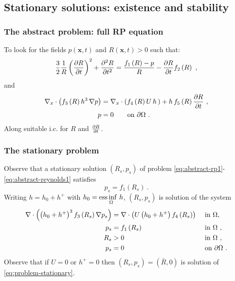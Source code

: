 \documentclass[10pt,aspectratio=169]{beamer}
\newenvironment{nalign}{
	\begin{equation}
	\begin{aligned}
}{
	\end{aligned}
	\end{equation}
	\ignorespacesafterend
}
\begin{document}

\subsection{Stationary solutions: existence and stability}
\setcounter{showSlideNumbers}{0}
\begin{frame}[noframenumbering]
\tableofcontents[
currentsection,
currentsubsection,
subsectionstyle=show/shaded/hide
]
\end{frame}
\setcounter{showSlideNumbers}{1}


\begin{frame}
\frametitle{The abstract problem: full RP equation}
To look for the fields $p(\mathbf{x},t)$ and $R(\mathbf{x},t)>0$ such that:
\begin{equation*}
\frac{3}{2}\frac{1}{R}\left(\frac{\partial R}{\partial t}\right)^2+\frac{\partial^2 R}{\partial t^2}=\frac{f_1\left(R\right)-p}{R}-\frac{\partial R}{\partial t}f_2\left(R\right)~,
\end{equation*}
and
\begin{align*}
\begin{split}
\nabla_x\cdot \left(f_3\left(R\right) h^3\,\nabla p\right)&=\nabla_x\cdot \left(f_4\left(R\right)U\,h\,\right)+h\,f_5\left(R\right)\frac{\partial R}{\partial t}~,\\
p&=0 \qquad\mbox{on } \partial \Omega~.
\end{split}
\end{align*}
Along suitable i.c. for $R$ and $\frac{\partial R}{\partial t}$.
\end{frame} 


\begin{frame}
\frametitle{The stationary problem}

Observe that a stationary solution $(R_s,p_s)$ of problem \eqref{eq:abstract-rp1}-\eqref{eq:abstract-reynolds1} satisfies
\begin{equation*}
p_s=f_1\left(R_s\right)~.
\end{equation*}
Writing $h=h_0+h^+$ with $h_0=\underset{\Omega}{\operatorname*{ess\,inf}{\,h}}$, $(R_s,p_s)$ is solution of the system
\begin{nalign}
	\nabla\cdot \left(\left(h_0+h^+\right)^3f_3\left(R_s\right)\nabla p_s\right)&=\nabla\cdot\left(U\left(h_0+h^+\right)f_4\left(R_s\right)\right)&&\textnormal{ in } \Omega,\\
	p_s&=f_1\left(R_s\right)&&\textnormal{ in } \Omega~,\\
	R_s&>0&&\textnormal{ in } \Omega~,\\
	p_s&=0&&\textnormal{ on }\partial \Omega~.
	\label{eq:problem-stationary}
\end{nalign}
Observe that if $U=0$ or $h^+=0$ then $\left(R_s,p_s\right)=\left(\bar{R},0\right)$ is solution of \eqref{eq:problem-stationary}.


\end{frame} 
\end{document}
